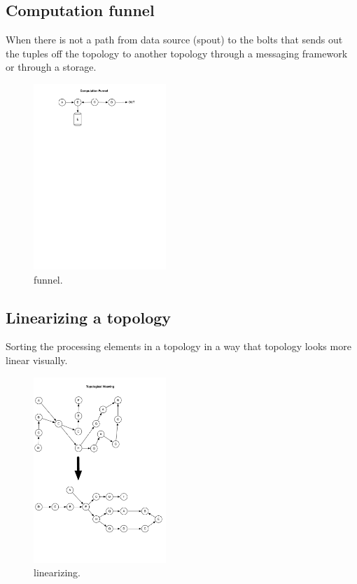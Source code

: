 \subsection{Computation funnel}
When there is not a path from data source (spout) to the bolts that sends out the tuples off the topology to another topology through a messaging framework or through a storage.

\begin{figure}[h!]
	\begin{center}
		\includegraphics[width=5cm]{images/funnel}
		\caption{funnel.}
		\label{fig:funnel}
	\end{center}
\end{figure}

\subsection{Linearizing a topology}

Sorting the processing elements in a topology in a way that topology looks more linear visually.

\begin{figure}[h!]
	\begin{center}
		\includegraphics[width=5cm]{images/linearizing}
		\caption{linearizing.}
		\label{fig:linearizing}
	\end{center}
\end{figure}